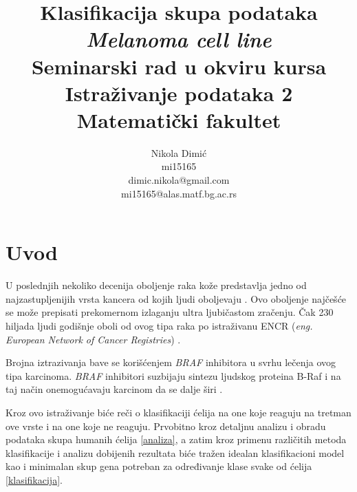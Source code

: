\documentclass[a4paper]{article}
\begin{document}
\title{Klasifikacija skupa podataka \textit{Melanoma cell line}\\ \small{Seminarski rad u okviru kursa\\Istraživanje podataka 2\\ Matematički fakultet}}

\author{Nikola Dimić \\ mi15165 \\  dimic.nikola@gmail.com\\
mi15165@alas.matf.bg.ac.rs
}

\maketitle

\tableofcontents

\newpage

\section{Uvod}
\label{sec:uvod}
U poslednjih nekoliko decenija oboljenje raka kože predstavlja jedno od najzastupljenijih vrsta kancera od kojih ljudi oboljevaju \cite{zastupljenost}. Ovo oboljenje najčešće se može prepisati prekomernom izlaganju ultra ljubičastom zračenju. Čak 230 hiljada ljudi godišnje oboli od ovog tipa raka po istraživanu ENCR (\textit{eng. European Network of Cancer Registries}) \cite{encr}. 

Brojna iztrazivanja bave se korišćenjem \textit{BRAF} inhibitora u svrhu lečenja ovog tipa karcinoma. \textit{BRAF} inhibitori suzbijaju sintezu ljudskog proteina B-Raf i na taj način onemogućavaju karcinom da se dalje širi \cite{braf}.

Kroz ovo istraživanje biće reči o klasifikaciji ćelija na one koje reaguju na tretman ove vrste i na one koje ne reaguju. Prvobitno kroz detaljnu analizu i obradu podataka skupa humanih ćelija \ref{analiza}, a zatim kroz primenu različitih metoda klasifikacije i analizu dobijenih rezultata biće tražen idealan klasifikacioni model kao i minimalan skup gena potreban za određivanje klase svake od ćelija \ref{klasifikacija}.
\end{document}
